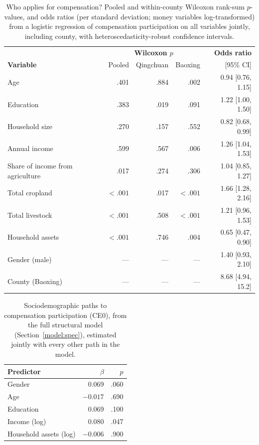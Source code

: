 \begin{table}[htbp]
\centering
\caption{Who applies for compensation? Pooled and within-county Wilcoxon
rank-sum $p$-values, and odds ratios (per standard deviation; money variables
log-transformed) from a logistic regression of compensation participation
on all variables jointly, including county, with heteroscedasticity-robust
confidence intervals.}
\label{tab:balance-check}
\small
\begin{tabular}{p{4.6cm}rrrr}
\hline
 & \multicolumn{3}{c}{\textbf{Wilcoxon $p$}} & \textbf{Odds ratio} \\
\textbf{Variable} & Pooled & Qingchuan & Baoxing & [95\% CI] \\
\hline
Age                      & .401   & .884 & .002 & 0.94 [0.76, 1.15] \\
Education                & .383   & .019 & .091 & 1.22 [1.00, 1.50] \\
Household size           & .270   & .157 & .552 & 0.82 [0.68, 0.99] \\
Annual income            & .599   & .567 & .006 & 1.26 [1.04, 1.53] \\
Share of income from agriculture & .017 & .274 & .306 & 1.04 [0.85, 1.27] \\
Total cropland           & $<.001$ & .017 & $<.001$ & 1.66 [1.28, 2.16] \\
Total livestock          & $<.001$ & .508 & $<.001$ & 1.21 [0.96, 1.53] \\
Household assets         & $<.001$ & .746 & .004 & 0.65 [0.47, 0.90] \\
Gender (male)            & --- & --- & --- & 1.40 [0.93, 2.10] \\
County (Baoxing)         & --- & --- & --- & 8.68 [4.94, 15.2] \\
\hline
\end{tabular}
\end{table}

\begin{table}[htbp]
\centering
\caption{Sociodemographic paths to compensation participation (CE0), from the
full structural model (Section~\ref{model:spec}), estimated jointly with
every other path in the model.}
\label{tab:demog-to-ce0}
\begin{tabular}{lrr}
\hline
\textbf{Predictor} & \textbf{$\beta$} & \textbf{$p$} \\
\hline
Gender     & 0.069  & .060 \\
Age        & $-0.017$ & .690 \\
Education  & 0.069  & .100 \\
Income (log)     & 0.080  & .047 \\
Household assets (log) & $-0.006$ & .900 \\
\hline
\end{tabular}
\end{table}

